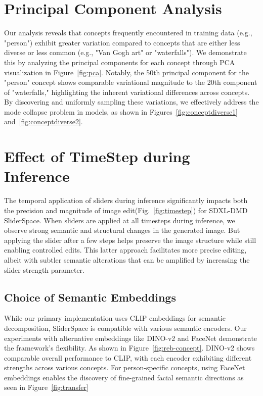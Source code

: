 \clearpage
\appendix
\setcounter{page}{1}

\maketitlesupplementary



\section{Principal Component Analysis}
Our analysis reveals that concepts frequently encountered in training data (e.g., "person") exhibit greater variation compared to concepts that are either less diverse or less common (e.g., "Van Gogh art" or "waterfalls"). We demonstrate this by analyzing the principal components for each concept through PCA visualization in Figure~\ref{fig:pca}. Notably, the 50th principal component for the "person" concept shows comparable variational magnitude to the 20th component of "waterfalls," highlighting the inherent variational differences across concepts. By discovering and uniformly sampling these variations, we effectively address the mode collapse problem in models, as shown in Figures~\ref{fig:conceptdiverse1} and~\ref{fig:conceptdiverse2}.


\section{Effect of TimeStep during Inference}
The temporal application of sliders during inference significantly impacts both the precision and magnitude of image edit(Fig.~\ref{fig:timestep}) for SDXL-DMD SliderSpace. When sliders are applied at all timesteps during inference, we observe strong semantic and structural changes in the generated image. But applying the slider after a few steps helps preserve the image structure while still enabling controlled edits. This latter approach facilitates more precise editing, albeit with subtler semantic alterations that can be amplified by increasing the slider strength parameter.


\subsection{Choice of Semantic Embeddings}
\label{sec:semantic}
While our primary implementation uses CLIP embeddings for semantic decomposition, SliderSpace is compatible with various semantic encoders. Our experiments with alternative embeddings like DINO-v2 and FaceNet demonstrate the framework's flexibility. As shown in Figure~\ref{fig:reb-concept}. DINO-v2 shows comparable overall performance to CLIP, with each encoder exhibiting different strengths across various concepts. For person-specific concepts, using FaceNet embeddings enables the discovery of fine-grained facial semantic directions as seen in Figure~\ref{fig:transfer}

